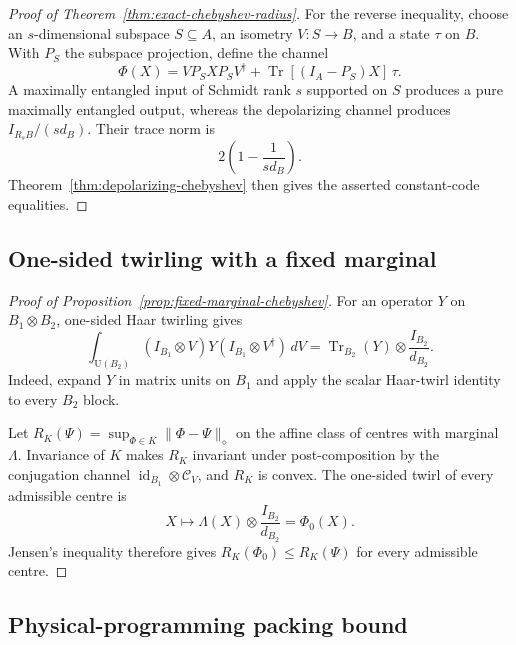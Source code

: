 \documentclass[11pt,a4paper]{article}
\theoremstyle{definition}
\theoremstyle{plain}
\theoremstyle{remark}
\DeclareMathOperator{\Tr}{Tr}
\begin{document}
\begin{proof}[Proof of Theorem~\ref{thm:exact-chebyshev-radius}]
For the reverse inequality, choose an $s$-dimensional subspace
$S\subseteq A$, an isometry $V:S\to B$, and a state $\tau$ on $B$. With
$P_S$ the subspace projection, define the channel
\[
\Phi(X)=VP_SXP_SV^\dagger+
\Tr[(I_A-P_S)X]\,\tau.
\]
A maximally entangled input of Schmidt rank $s$ supported on $S$ produces a
pure maximally entangled output, whereas the depolarizing channel produces
$I_{R_sB}/(sd_B)$. Their trace norm is
\[
2\left(1-\frac1{sd_B}\right).
\]
Theorem~\ref{thm:depolarizing-chebyshev} then gives the asserted constant-code
equalities.
\end{proof}

\subsection{One-sided twirling with a fixed marginal}
\label{app:fixed-marginal-proof}

\begin{proof}[Proof of Proposition~\ref{prop:fixed-marginal-chebyshev}]
For an operator $Y$ on $B_1\otimes B_2$, one-sided Haar twirling gives
\[
\int_{\mathrm U(B_2)}
(I_{B_1}\otimes V)Y(I_{B_1}\otimes V^\dagger)\,dV
=
\Tr_{B_2}(Y)\otimes\frac{I_{B_2}}{d_{B_2}}.
\]
Indeed, expand $Y$ in matrix units on $B_1$ and apply the scalar Haar-twirl
identity to every $B_2$ block.

Let $R_K(\Psi)=\sup_{\Phi\in K}\|\Phi-\Psi\|_\diamond$ on the affine class
of centres with marginal $\Lambda$. Invariance of $K$ makes $R_K$ invariant
under post-composition by the conjugation channel
$\operatorname{id}_{B_1}\otimes\mathcal C_V$, and $R_K$ is convex. The
one-sided twirl of every admissible centre is
\[
X\longmapsto\Lambda(X)\otimes\frac{I_{B_2}}{d_{B_2}}=\Phi_0(X).
\]
Jensen's inequality therefore gives $R_K(\Phi_0)\leq R_K(\Psi)$ for every
admissible centre.
\end{proof}

\subsection{Physical-programming packing bound}
\label{app:program-packing-proof}
\end{document}
